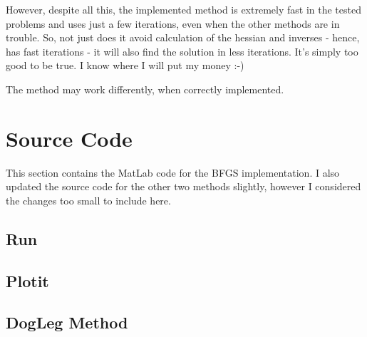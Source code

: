 \documentclass[10pt,oneside,a4paper,final,english]{memoir}
\begin{document}
However, despite all this, the implemented method is extremely fast in
the tested problems and uses just a few iterations, even when the
other methods are in trouble. So, not just does it avoid calculation
of the hessian and inverses - hence, has fast iterations - it will
also find the solution in less iterations. It's simply too good to be
true. I know where I will put my money :-)

The method may work differently, when correctly implemented.



\section{Source Code}
This section contains the MatLab code for the BFGS implementation. I
also updated the source code for the other two methods slightly,
however I considered the changes too small to include here.

\subsection{Run}


\subsection{Plotit}


\subsection{DogLeg Method}

\end{document}
